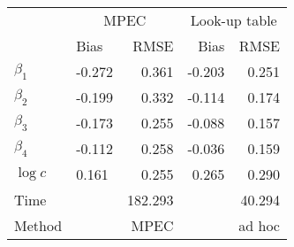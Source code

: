 
\begin{tabular}[t]{llrrr}
\toprule
\multicolumn{1}{c}{ } & \multicolumn{2}{c}{MPEC} & \multicolumn{2}{c}{Look-up table} \\
\cmidrule(l{3pt}r{3pt}){2-3} \cmidrule(l{3pt}r{3pt}){4-5}
  & Bias & RMSE & Bias & RMSE\\
\midrule
$\beta_{1}$ & -0.272 & 0.361 & -0.203 & 0.251\\
$\beta_{2}$ & -0.199 & 0.332 & -0.114 & 0.174\\
$\beta_{3}$ & -0.173 & 0.255 & -0.088 & 0.157\\
$\beta_{4}$ & -0.112 & 0.258 & -0.036 & 0.159\\
$\log c$ & 0.161 & 0.255 & 0.265 & 0.290\\
Time &  & 182.293 &  & 40.294\\
Method &  & MPEC &  & ad hoc\\
\bottomrule
\end{tabular}
